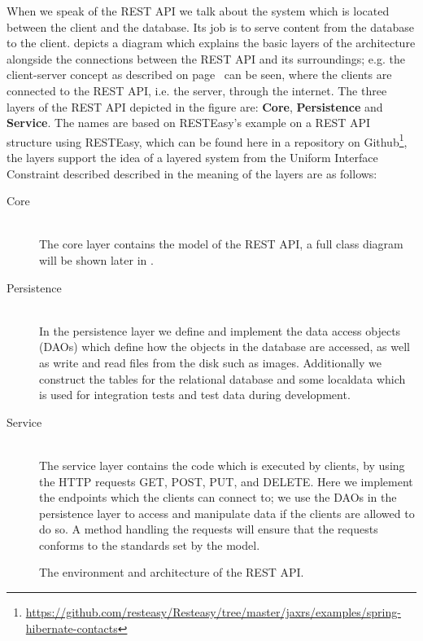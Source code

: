 When we speak of the REST API we talk about the system which is located between the client and the database.
Its job is to serve content from the database to the client.
 depicts a diagram which explains the basic layers of the architecture alongside the connections between the REST API and its surroundings; e.g. the client-server concept as described on page~\pageref{client-server-rest} can be seen, where the clients are connected to the REST API, i.e. the server, through the internet.
The three layers of the REST API depicted in the figure are: \textbf{Core}, \textbf{Persistence} and \textbf{Service}.
The names are based on RESTEasy's example on a REST API structure using RESTEasy, which can be found here in a repository on Github\footnote{\url{https://github.com/resteasy/Resteasy/tree/master/jaxrs/examples/spring-hibernate-contacts}}, the layers support the idea of a layered system from the Uniform Interface Constraint described described in  the meaning of the layers are as follows:
\begin{description}
    \item[Core] \hfill \\
    The core layer contains the model of the REST API, a full class diagram will be shown later in .

    \item[Persistence] \hfill \\
    In the persistence layer we define and implement the data access objects (DAOs) which define how the objects in the database are accessed, as well as write and read files from the disk such as images.
    Additionally we construct the tables for the relational database and some localdata which is used for integration tests and test data during development.

    \item[Service] \hfill \\
    The service layer contains the code which is executed by clients, by using the HTTP requests GET, POST, PUT, and DELETE.
    Here we implement the endpoints which the clients can connect to; we use the DAOs in the persistence layer to access and manipulate data if the clients are allowed to do so. 
    A method handling the requests will ensure that the requests conforms to the standards set by the model.
\end{description}

\begin{figure}[h]
    \centering
    
    \caption{The environment and architecture of the REST API.}\label{fig:rest-architecture}
\end{figure}

